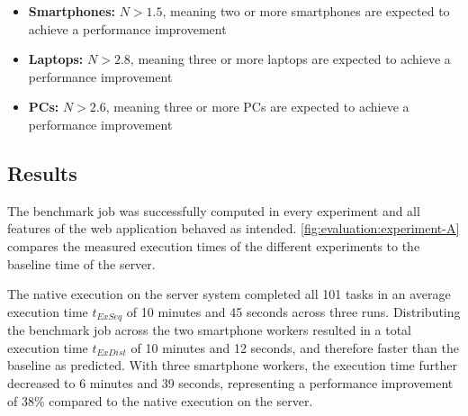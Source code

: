 \begin{itemize}
    \item \textbf{Smartphones:} $N > 1.5$, meaning two or more smartphones are expected to achieve a performance improvement 
    \item \textbf{Laptops:} $N > 2.8$, meaning three or more laptops are expected to achieve a performance improvement
    \item \textbf{PCs:} $N > 2.6$, meaning three or more \acs{PC}s are expected to achieve a performance improvement
\end{itemize}

\subsection{Results}
The benchmark job was successfully computed in every experiment and all features of the web application behaved as intended. \autoref{fig:evaluation:experiment-A} compares the measured execution times of the different experiments to the baseline time of the server.

The native execution on the server system completed all 101 tasks in an average execution time $t_{ExSeq}$ of 10 minutes and 45 seconds across three runs. Distributing the benchmark job across the two smartphone workers resulted in a total execution time $t_{ExDist}$ of 10 minutes and 12 seconds, and therefore faster than the baseline as predicted. With three smartphone workers, the execution time further decreased to 6 minutes and 39 seconds, representing a performance improvement of 38\% compared to the native execution on the server.

